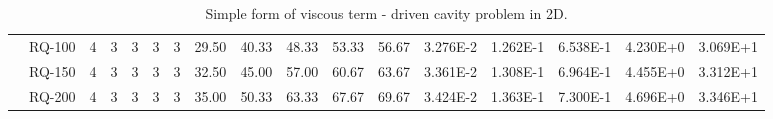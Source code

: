 \begin{table}[ht]
\begin{center}
{\begin{tabular}{cc|c|c|c|c|c|c|c|c|c|c|c|c|c|c|c|}
\multicolumn{1}{|c|}{}                      & \multicolumn{1}{|c|}{RQ-100} &	4	&	3	&	3	&	3	&	3	&	29.50	&	40.33	&	48.33	&	53.33	&	56.67	&	3.276E-2	&	1.262E-1	&	6.538E-1	&	4.230E+0	&	3.069E+1	\\
\multicolumn{1}{|c|}{}                      & \multicolumn{1}{|c|}{RQ-150} &	4	&	3	&	3	&	3	&	3	&	32.50	&	45.00	&	57.00	&	60.67	&	63.67	&	3.361E-2	&	1.308E-1	&	6.964E-1	&	4.455E+0	&	3.312E+1	\\
\multicolumn{1}{|c|}{}                      & \multicolumn{1}{|c|}{RQ-200} & 	4	&	3	&	3	&	3	&	3	&	35.00	&	50.33	&	63.33	&	67.67	&	69.67	&	3.424E-2	&	1.363E-1	&	7.300E-1	&	4.696E+0	&	3.346E+1	\\
\cline{1-17}
\end{tabular}
}
\end{center}
\caption{Simple form of viscous term - driven cavity problem in 2D.}
\label{table:simpledrivencavity2d}
\end{table}

